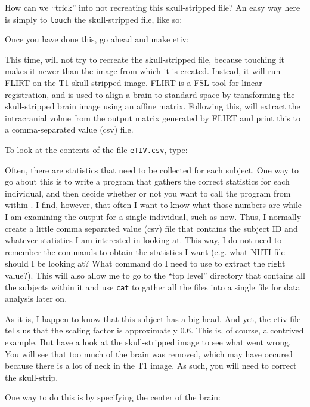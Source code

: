 How can we ``trick'' \maken{} into not recreating this skull-stripped file? An easy way here is simply to \texttt{touch} the skull-stripped file, like so:

Once you have done this, go ahead and make etiv:

This time, \maken{} will not try to recreate the skull-stripped file, because touching it makes it newer than the image from which it is created. Instead, it will run FLIRT on the T1 skull-stripped image. FLIRT is a FSL tool for linear registration, and is used to align a brain to standard space by transforming the skull-stripped brain image using an affine matrix. Following this, \maken{} will extract the intracranial volme from the output matrix generated by FLIRT and print this to a comma-separated value (csv) file.

To look at the contents of the file \texttt{eTIV.csv}, type:

Often, there are statistics that need to be collected for each subject. One way to go about this is to write a program that gathers the correct statistics for each individual, and then decide whether or not you want to call the program from within \maken{}. I find, however, that often I want to know what those numbers are while I am examining the output for a single individual, such as now. Thus, I normally create a little comma separated value (csv) file that contains the subject ID and whatever statistics I am interested in looking at. This way, I do not need to remember the commands to obtain the statistics I want (e.g. what NIfTI file should I be looking at? What command do I need to use to extract the right value?). This will also allow me to go to the ``top level'' directory that contains all the subjects within it and use \texttt{cat} to gather all the files into a single file for data analysis later on.

As it is, I happen to know that this subject has a big head. And yet, the etiv file tells us that the scaling factor is approximately 0.6. This is, of course, a contrived example. But have a look at the skull-stripped image to see what went wrong. You will see that too
much of the brain was removed, which may have occured because there is a lot of neck in the T1 image.
As such, you will need to correct the skull-strip.

One way to do this is by specifying the center of the brain:

